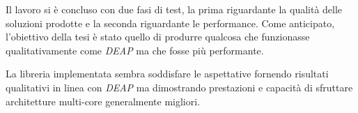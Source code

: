 Il lavoro si è concluso con due fasi di test, la prima riguardante la qualità
delle soluzioni prodotte e la seconda riguardante le performance. Come
anticipato, l'obiettivo della tesi è stato quello di produrre qualcosa che
funzionasse qualitativamente come \textit{DEAP} ma che fosse più performante.

La libreria implementata sembra soddisfare le aspettative fornendo risultati
qualitativi in linea con \textit{DEAP} ma dimostrando prestazioni e capacità
di sfruttare architetture multi-core generalmente migliori.
